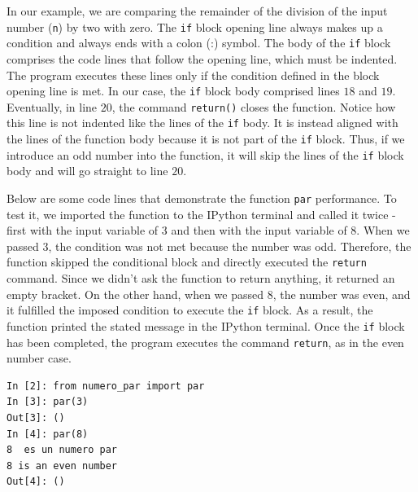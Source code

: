 \begin{paracol}{2}
In our example, we are comparing the remainder of the division of the input number (\texttt{n}) by two with zero. The \texttt{if} block opening line always makes up a condition and always ends with a colon (:) symbol. The body of the \texttt{if} block comprises the code lines that follow the opening line, which must be indented. The program executes these lines only if the condition defined in the block opening line is met. In our case, the \texttt{if} block body comprised lines $18$ and $19$. Eventually, in line $20$, the command \texttt{return()} closes the function. Notice how this line is not indented like the lines of the \texttt{if} body. It is instead aligned with the lines of the function body because it is not part of the \texttt{if} block. Thus, if we introduce an odd number into the function, it will skip the lines of the \texttt{if}
block body and will go straight to line $20$.

Below are some code lines that demonstrate the function  \texttt{par} performance. To test it, we imported the function to the IPython terminal and called it twice - first with the input variable of 3 and then with the input variable of 8. When we passed 3, the condition was not met because the number was odd. Therefore, the function skipped the conditional block and directly executed the \texttt{return} command. Since we didn't ask the function to return anything, it returned an empty bracket.
On the other hand, when we passed 8, the number was even, and it fulfilled the imposed condition to execute the \texttt{if} block. As a result, the function printed the stated message in the IPython terminal. Once the \texttt{if} block has been completed, the program executes the command \texttt{return}, as in the even number case.

\end{paracol}

\begin{center}
    \begin{minipage}{.4\textwidth}
\begin{verbatim}
In [2]: from numero_par import par
In [3]: par(3)
Out[3]: ()
In [4]: par(8)
8  es un numero par
8 is an even number
Out[4]: ()
\end{verbatim}
\end{minipage}
\end{center}

